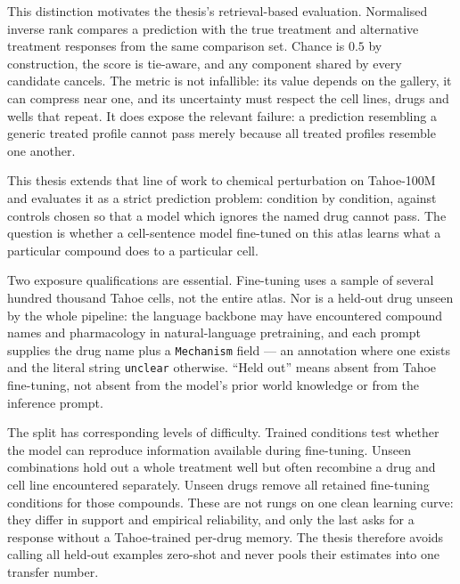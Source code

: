 This distinction motivates the thesis's retrieval-based evaluation. Normalised inverse rank
compares a prediction with the true treatment and alternative treatment responses from the same
comparison set. Chance is $0.5$ by construction, the score is tie-aware, and any component shared
by every candidate cancels. The metric is not infallible: its value depends on the gallery, it can
compress near one, and its uncertainty must respect the cell lines, drugs and wells that repeat.
It does expose the relevant failure: a prediction resembling a generic treated profile cannot pass
merely because all treated profiles resemble one another.

This thesis extends that line of work to chemical perturbation on Tahoe-100M and evaluates it as a
strict prediction problem: condition by condition, against controls chosen so that a model which
ignores the named drug cannot pass. The question is whether a cell-sentence model fine-tuned on this
atlas learns what a particular compound does to a particular cell.

Two exposure qualifications are essential. Fine-tuning uses a sample of several hundred thousand
Tahoe cells, not the entire atlas. Nor is a held-out drug unseen by the whole pipeline: the language
backbone may have encountered compound names and pharmacology in natural-language pretraining, and
each prompt supplies the drug name plus a \texttt{Mechanism} field --- an annotation where one
exists and the literal string \texttt{unclear} otherwise. ``Held out'' means absent from Tahoe
fine-tuning, not absent from the model's prior world knowledge or from the inference prompt.

The split has corresponding levels of difficulty. Trained conditions test whether the model can
reproduce information available during fine-tuning. Unseen combinations hold out a whole treatment well
but often recombine a drug and cell line encountered separately. Unseen drugs remove all
retained fine-tuning conditions for those compounds. These are not rungs on one clean learning
curve: they differ in support and empirical reliability, and only the last asks for a response
without a Tahoe-trained per-drug memory. The thesis therefore avoids calling all held-out examples
zero-shot and never pools their estimates into one transfer number.

